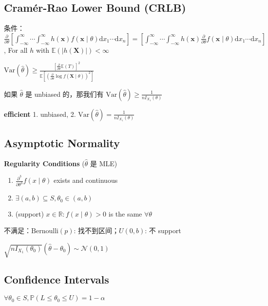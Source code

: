 \documentclass[9pt,landscape]{article}
\begin{document}
\begin{multicols}{3}
\subsection{Cramér-Rao Lower Bound (CRLB)}

条件：$\frac{\partial}{\partial\theta}\left[\int_{-\infty}^{\infty}\cdots\int_{-\infty}^{\infty}h(\boldsymbol{x})f(\boldsymbol{x}\mid\theta)\mathrm{d}x_1\cdots\mathrm{d}x_n\right]=\left[\int_{-\infty}^{\infty}\cdots\int_{-\infty}^{\infty}h(\boldsymbol{x})\frac{\partial}{\partial\theta}f(\boldsymbol{x}\mid\theta)\mathrm{d}x_1\cdots\mathrm{d}x_n\right]$, For all $h$ with $\mathbb{E}(|h(\boldsymbol{X})|)<\infty$

$\mathrm{Var}(\hat{\theta})\ge \frac{\left[\frac{\partial}{\partial\theta}\mathbb{E}(T)\right]^2}{\mathbb{E}\left[\left(\frac{\partial}{\partial\theta}\log f(\boldsymbol{X}\mid\theta)\right)^2	\right]}$

如果 $\hat{\theta}$ 是 unbiased 的，那我们有 $\mathrm{Var}(\hat{\theta})\ge\frac{1}{nI_{X_1}(\theta)}$

\textbf{efficient} 1. unbiased, 2. $\mathrm{Var}(\hat{\theta})=\frac{1}{nI_{X_1}(\theta)}$

\subsection{Asymptotic Normality}

\textbf{Regularity Conditions} ($\hat{\theta}$ 是 MLE)
\begin{enumerate}
	\item $\frac{\partial^3}{\partial\theta^3}f(x\mid\theta)$ exists and continuous
	\item $\exists (a, b)\subseteq S, \theta_0\in(a, b)$
	\item (support) ${x\in\mathbb{R}: f(x\mid\theta)>0}$ is the same $\forall\theta$
\end{enumerate}

不满足：$\mathrm{Bernoulli}(p)$: 找不到区间；$U(0, b)$: 不 support

$\sqrt{nI_{X_1}(\theta_0)}(\hat{\theta}-\theta_0)\sim\mathcal{N}(0, 1)$

\subsection{Confidence Intervals}

$\forall\theta_0\in S, \mathbb{P}(L\le \theta_0\le U)=1-\alpha$

\end{multicols}
\end{document}
